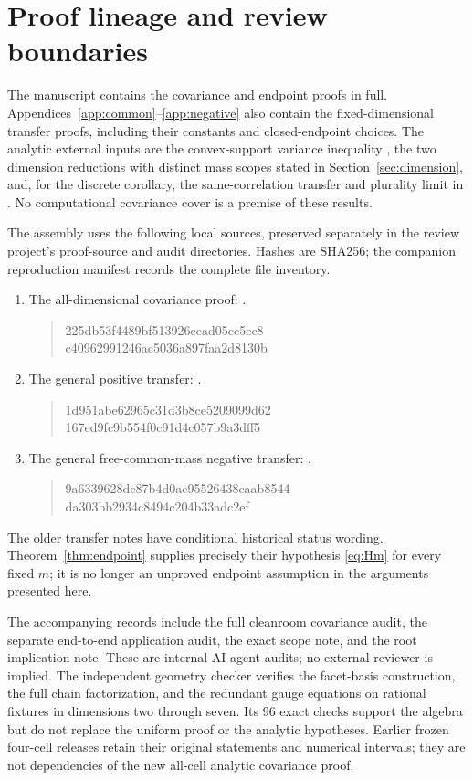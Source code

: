 \section{Proof lineage and review boundaries}\label{app:lineage}
The manuscript contains the covariance and endpoint proofs in full.
Appendices~\ref{app:common}--\ref{app:negative} also contain the fixed-dimensional
transfer proofs, including their constants and closed-endpoint choices.
The analytic external inputs are the convex-support variance inequality
\cite[Proposition 2.1]{BL2000}, the two dimension reductions with distinct mass
scopes stated in Section~\ref{sec:dimension}, and, for the discrete corollary,
the same-correlation transfer and plurality limit in \cite{IM2009}.
No computational covariance cover is a premise of these results.

The assembly uses the following local sources, preserved separately in the
review project's proof-source and audit directories. Hashes are SHA256; the
companion reproduction manifest records the complete file inventory.
\begin{enumerate}
\item The all-dimensional covariance proof:
.
\begin{quote}\small\ttfamily
225db53f4489bf513926eead05cc5ec8\\
c40962991246ac5036a897faa2d8130b
\end{quote}
\item The general positive transfer:
.
\begin{quote}\small\ttfamily
1d951abe62965c31d3b8ce5209099d62\\
167ed9fc9b554f0c91d4c057b9a3dff5
\end{quote}
\item The general free-common-mass negative transfer:
.
\begin{quote}\small\ttfamily
9a6339628de87b4d0ae95526438caab8544\\
da303bb2934c8494c204b33adc2ef
\end{quote}
\end{enumerate}
The older transfer notes have conditional historical status wording.
Theorem~\ref{thm:endpoint} supplies precisely their hypothesis
\eqref{eq:Hm} for every fixed $m$; it is no longer an unproved endpoint
assumption in the arguments presented here.

The accompanying records include the full cleanroom covariance audit,
the separate end-to-end application audit, the exact scope note, and the
root implication note. These are internal AI-agent audits; no external
reviewer is implied. The independent geometry checker verifies the
facet-basis construction, the full chain factorization, and the redundant
gauge equations on rational fixtures in dimensions two through seven.
Its 96 exact checks support the algebra but do not replace the uniform
proof or the analytic hypotheses. Earlier frozen four-cell releases retain
their original statements and numerical intervals; they are not dependencies
of the new all-cell analytic covariance proof.

